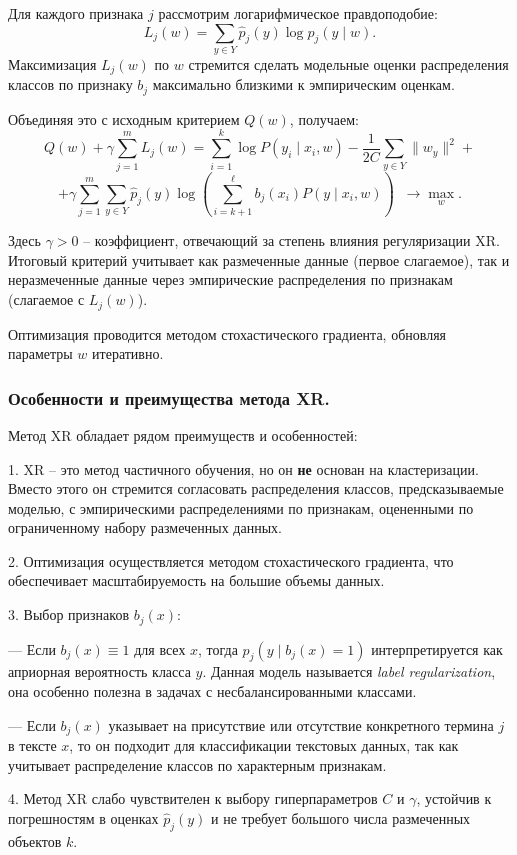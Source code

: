Для каждого признака $j$ рассмотрим логарифмическое правдоподобие:
\[
L_j(w) = \sum_{y \in Y} \hat{p}_j(y) \log p_j(y \mid w).
\]
Максимизация $L_j(w)$ по $w$ стремится сделать модельные оценки распределения классов по признаку $b_j$ максимально близкими к эмпирическим оценкам. 

Объединяя это с исходным критерием $Q(w)$, получаем:
\[
Q(w) + \gamma \sum_{j=1}^m L_j(w) = \sum_{i=1}^k \log P(y_i \mid x_i, w) 
- \frac{1}{2C}\sum_{y \in Y}\|w_y\|^2 +
\]
\[
+ \gamma \sum_{j=1}^m \sum_{y \in Y} \hat{p}_j(y)\log\left(\sum_{i=k+1}^{\ell} b_j(x_i)P(y \mid x_i, w)\right) \;\; \to \max_w.
\]

Здесь $\gamma > 0$ – коэффициент, отвечающий за степень влияния регуляризации XR. Итоговый критерий учитывает как размеченные данные (первое слагаемое), так и неразмеченные данные через эмпирические распределения по признакам (слагаемое с $L_j(w)$).

Оптимизация проводится методом стохастического градиента, обновляя параметры $w$ итеративно.

\subsubsection*{Особенности и преимущества метода XR.}

Метод XR обладает рядом преимуществ и особенностей:

1. XR – это метод частичного обучения, но он \textbf{не} основан на кластеризации. Вместо этого он стремится согласовать распределения классов, предсказываемые моделью, с эмпирическими распределениями по признакам, оцененными по ограниченному набору размеченных данных.

2. Оптимизация осуществляется методом стохастического градиента, что обеспечивает масштабируемость на большие объемы данных.

3. Выбор признаков $b_j(x)$:

--- Если $b_j(x) \equiv 1$ для всех $x$, тогда $p_j(y \mid b_j(x)=1)$ интерпретируется как априорная вероятность класса $y$. Данная модель называется \textit{label regularization}, она особенно полезна в задачах с несбалансированными классами.

--- Если $b_j(x)$ указывает на присутствие или отсутствие конкретного термина $j$ в тексте $x$, то он подходит для классификации текстовых данных, так как учитывает распределение классов по характерным признакам.

4. Метод XR слабо чувствителен к выбору гиперпараметров $C$ и $\gamma$, устойчив к погрешностям в оценках $\hat{p}_j(y)$ и не требует большого числа размеченных объектов $k$.

